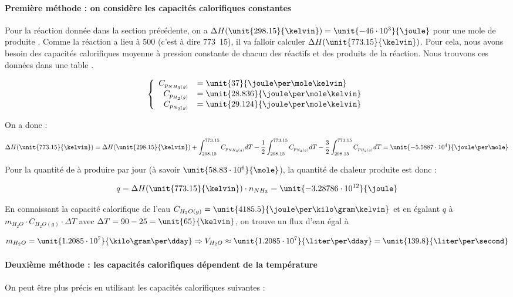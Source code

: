 \paragraph{Première méthode : on considère les capacités calorifiques constantes}
Pour la réaction donnée dans la section précédente, on a $\Delta H(\unit{298.15}{\kelvin})
 = \unit{-46 \cdot 10^3}{\joule}$ pour une mole de  produite \cite{atkins}.
Comme la réaction a lieu à \unit{500}{\celsius} (c'est à dire \unit{773.15}{\kelvin}), il
va falloir calculer $\Delta H(\unit{773.15}{\kelvin})$. Pour cela, nous avons besoin
des capacités calorifiques moyenne à pression constante de chacun des réactifs et des produits
de la réaction. Nous trouvons ces données dans une table \cite{atkins}.

	$$
	\left\{
		\begin{array}{rl}
			C_{p_{NH_3(g)}} &= \unit{37}{\joule\per\mole\kelvin}\\
			C_{p_{H_2(g)}} 	&= \unit{28.836}{\joule\per\mole\kelvin}\\
			C_{p_{N_2(g)}} 	&= \unit{29.124}{\joule\per\mole\kelvin}
		\end{array}
	\right.
	$$

On a donc :

$$\Delta H(\unit{773.15}{\kelvin}) = \Delta H(\unit{298.15}{\kelvin})
+ \int_{298.15}^{773.15} C_{p_{NH_3(g)}} dT - \frac{1}{2}\int_{298.15}^{773.15} C_{p_{N_2(g)}} dT
- \frac{3}{2} \int_{298.15}^{773.15} C_{p_{H_2(g)}} dT = \unit{-5.5887 \cdot 10^4}{\joule\per\mole}$$

Pour la quantité de  à produire par jour (à savoir $\unit{58.83 \cdot 10^6}{\mole}$),
la quantité de chaleur produite est donc :

$$q = \Delta H(\unit{773.15}{\kelvin}) \cdot n_{NH_3} = \unit{-3.28786 \cdot 10^{12}}{\joule}$$

En connaissant la capacité calorifique de l'eau $C_{H_2O(g)} = \unit{4185.5}{\joule\per\kilo\gram\kelvin}$ \cite{atkins}et en égalant
$q$ à $m_{H_2O} \cdot C_{H_2O(g)} \cdot \Delta T$ avec $\Delta T = 90 - 25 = \unit{65}{\kelvin}$, on trouve un
flux d'eau égal à

$$m_{H_2O} = \unit{1.2085 \cdot 10^7}{\kilo\gram\per\dday} \Rightarrow V_{H_2O} \approx \unit{1.2085 \cdot 10^7}{\liter\per\dday} 
= \unit{139.8}{\liter\per\second}$$

\paragraph{Deuxième méthode : les capacités calorifiques dépendent de la température}
On peut être plus précis en utilisant les capacités calorifiques suivantes \cite{hc-table} :

